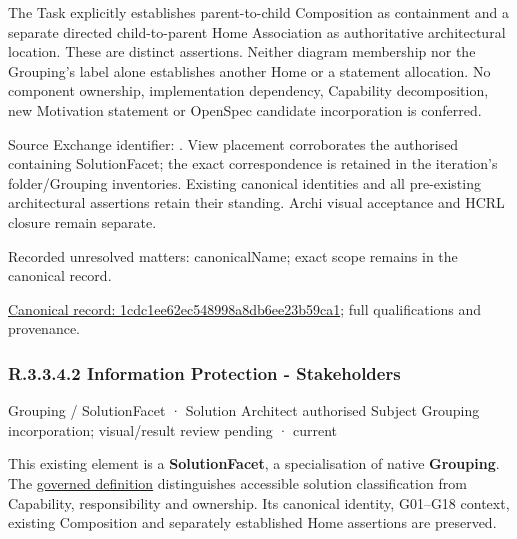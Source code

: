 The Task explicitly establishes parent-to-child Composition as containment and
a separate directed child-to-parent Home Association as authoritative architectural
location. These are distinct assertions. Neither diagram membership nor the
Grouping's label alone establishes another Home or a statement allocation.
No component ownership, implementation dependency, Capability decomposition,
new Motivation statement or OpenSpec candidate incorporation is conferred.



Source Exchange identifier: \texttt{}. View placement corroborates
the authorised containing SolutionFacet; the exact correspondence is retained in the
iteration's folder/Grouping inventories. Existing canonical identities and all
pre-existing architectural assertions retain their standing. Archi visual
acceptance and HCRL closure remain separate.


{\small Recorded unresolved matters: canonicalName; exact scope remains in the canonical record.}\par
{\footnotesize \href{../../../../../../../continuum/grouping/1cdc1ee62ec548998a8db6ee23b59ca1.md}{Canonical record: 1cdc1ee62ec548998a8db6ee23b59ca1}; full qualifications and provenance.}\par
\subsubsection*{R.3.3.4.2 Information Protection - Stakeholders}
\label{navigation:R.3.3.4.2}

\label{element:66ec039ab4f042a8b4817ca1dafaedfe}
{\small Grouping / SolutionFacet · Solution Architect authorised Subject Grouping incorporation; visual/result review pending · current}\par

This existing element is a \textbf{SolutionFacet}, a specialisation of native
\textbf{Grouping}. The \href{\detokenize{../../../../../../../governance/continuum-representation.md#solutionfacet-classification--1119-candidate}}{governed definition}
distinguishes accessible solution classification from Capability, responsibility
and ownership. Its canonical identity, G01–G18 context, existing Composition
and separately established Home assertions are preserved.



